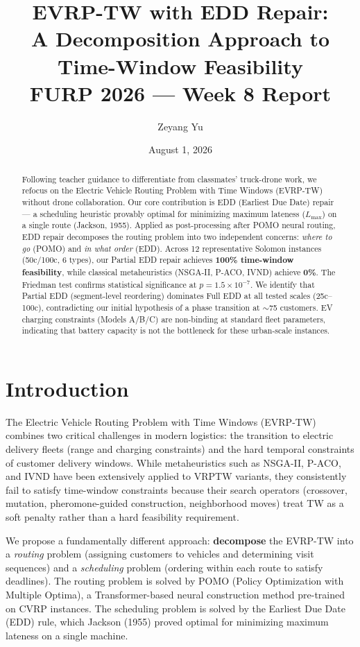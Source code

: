 \documentclass[11pt,a4paper]{article}
\title{\textbf{EVRP-TW with EDD Repair:\\
A Decomposition Approach to Time-Window Feasibility}\\[8pt]
       \large FURP 2026 — Week 8 Report}
\author{Zeyang Yu}
\date{August 1, 2026}
\begin{document}
\maketitle

\begin{abstract}
Following teacher guidance to differentiate from classmates' truck-drone work,
we refocus on the Electric Vehicle Routing Problem with Time Windows (EVRP-TW)
without drone collaboration. Our core contribution is EDD (Earliest Due Date)
repair — a scheduling heuristic provably optimal for minimizing maximum lateness
($L_{\max}$) on a single route (Jackson, 1955). Applied as post-processing after
POMO neural routing, EDD repair decomposes the routing problem into two independent
concerns: \textit{where to go} (POMO) and \textit{in what order} (EDD). Across 12
representative Solomon instances (50c/100c, 6 types), our Partial EDD repair achieves
\textbf{100\% time-window feasibility}, while classical metaheuristics (NSGA-II,
P-ACO, IVND) achieve \textbf{0\%}. The Friedman test confirms statistical significance
at $p = 1.5 \times 10^{-7}$. We identify that Partial EDD (segment-level reordering)
dominates Full EDD at all tested scales (25c--100c), contradicting our initial
hypothesis of a phase transition at $\sim$75 customers. EV charging constraints
(Models A/B/C) are non-binding at standard fleet parameters, indicating that
battery capacity is not the bottleneck for these urban-scale instances.
\end{abstract}

\section{Introduction}

The Electric Vehicle Routing Problem with Time Windows (EVRP-TW) combines two
critical challenges in modern logistics: the transition to electric delivery
fleets (range and charging constraints) and the hard temporal constraints of
customer delivery windows. While metaheuristics such as NSGA-II, P-ACO, and
IVND have been extensively applied to VRPTW variants, they consistently fail
to satisfy time-window constraints because their search operators (crossover,
mutation, pheromone-guided construction, neighborhood moves) treat TW as a
soft penalty rather than a hard feasibility requirement.

We propose a fundamentally different approach: \textbf{decompose} the EVRP-TW
into a \textit{routing} problem (assigning customers to vehicles and determining
visit sequences) and a \textit{scheduling} problem (ordering within each route
to satisfy deadlines). The routing problem is solved by POMO (Policy Optimization
with Multiple Optima), a Transformer-based neural construction method pre-trained
on CVRP instances. The scheduling problem is solved by the Earliest Due Date
(EDD) rule, which Jackson (1955) proved optimal for minimizing maximum lateness
on a single machine.
\end{document}
